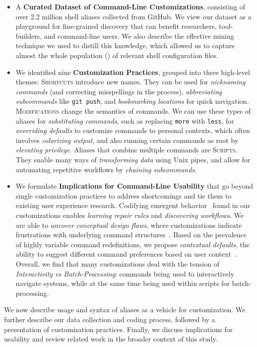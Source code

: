 \documentclass[smallextended,natbib]{svjour3}
\newcommand{\per}[1]{\numprint[\%]{#1}}
\newcommand{\cmd}[1]{{\texttt{#1}}}
\begin{document}
\begin{itemize}
	\item A \textbf{Curated Dataset of Command-Line Customizations}, consisting of over 2.2 million shell aliases collected from GitHub.
	We view our dataset as a playground for fine-grained discovery that can benefit researchers, tool-builders, and command-line users.
	We also describe the effective mining technique we used to distill this knowledge, which allowed us to capture almost the whole population (\per{94.09}) of relevant shell configuration files.
	\smallskip
	
	\item We identified nine \textbf{Customization Practices}, grouped into three high-level themes:
	\textsc{Shortcuts} introduce new names.
	They can be used for \emph{nicknaming commands} (and correcting misspellings in the process),
	\emph{abbreviating subcommands} like \texttt{git push},
	and \emph{bookmarking locations} for quick navigation.
	\textsc{Modifications} change the semantics of commands.
	We can use these types of aliases for \emph{substituting commands}, such as replacing \cmd{more} with \cmd{less},
	for \emph{overriding defaults} to customize commands to personal contexts, 
	which often involves \emph{colorizing output},
	and also running certain commands as root by \emph{elevating privilege}.
	Aliases that combine multiple commands are \textsc{Scripts}.
	They enable many ways of \emph{transforming data} using Unix pipes, 
	and allow for automating repetitive workflows by \emph{chaining subcommands}.
	\smallskip
	
	\item We formulate \textbf{Implications for Command-Line Usability} that go beyond single customization practices to address shortcomings and tie them to existing user experience research.
	Codifying emergent behavior~\citep{fast:14} found in our customizations enables \emph{learning repair rules} and \emph{discovering workflows}.
	We are able to \emph{uncover conceptual design flaws}, where customizations indicate frustrations with underlying command structures~\citep{perez:13}.
	Based on the prevalence of highly variable command redefinitions, we propose \emph{contextual defaults}, the ability to suggest different command preferences based on user context~\citep{stefanidis:11}.
	Overall, we find that many customizations deal with the tension of \emph{Interactivity vs Batch-Processing}: commands being used to interactively navigate systems, while at the same time being used within scripts for batch-processing.
\end{itemize}
We now describe usage and syntax of aliases as a vehicle for customization. We further describe our data collection and coding process, followed by a presentation of customization practices. Finally, we discuss implications for usability and review related work in the broader context of this study.
\end{document}
